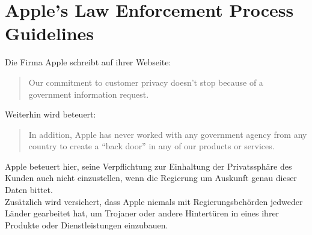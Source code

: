 \section{Apple's Law Enforcement Process Guidelines}
	Die Firma Apple schreibt auf ihrer
	Webseite:
	\begin{quote}
		Our commitment to customer privacy doesn't stop because of a government
		information request.\cite{AppleGovInfo2015}
	\end{quote}
	Weiterhin wird beteuert:
	\begin{quote}
		In addition, Apple has never worked with any government agency from any
		country to create a "`back door"' in any of our products or
		services.\cite{AppleGovInfo2015}
	\end{quote}
	Apple beteuert hier, seine Verpflichtung zur Einhaltung der Privatssphäre des
	Kunden auch nicht einzustellen, wenn die Regierung um Auskunft genau dieser
	Daten bittet.\\
	Zusätzlich wird versichert, dass Apple niemals mit Regierungsbehörden
	jedweder Länder gearbeitet hat, um Trojaner oder andere Hintertüren in eines
	ihrer Produkte oder Dienstleistungen einzubauen.

